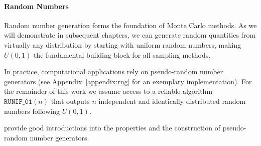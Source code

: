 \paragraph{Random Numbers}
Random number generation forms the foundation of Monte Carlo methods. As we will demonstrate in subsequent chapters, we can generate random quantities from virtually any distribution by starting with uniform random numbers, making $U(0,1)$ the fundamental building block for all sampling methods.

In practice, computational applications rely on pseudo-random number generators (see Appendix~\ref{appendix:rng} for an exemplary implementation). For the remainder of this work we assume access to a reliable algorithm $\texttt{RUNIF\_01}(n)$ that outputs $n$ independent and identically distributed random numbers following $U(0,1)$.

\cite{thomopoulos_essentials_2013, lemieux_monte_2009} provide good introductions into the properties and the construction of pseudo-random number generators.